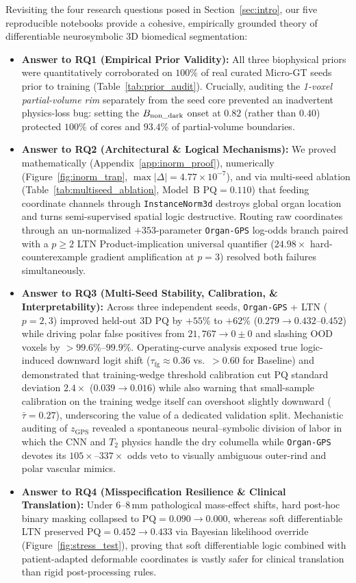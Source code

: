 \documentclass[10pt,a4paper]{article}
\renewcommand{\_}{\origunderscore\allowbreak}
\begin{document}
Revisiting the four research questions posed in Section~\ref{sec:intro}, our five reproducible notebooks provide a cohesive, empirically grounded theory of differentiable neurosymbolic 3D biomedical segmentation:
\begin{itemize}
    \item \textbf{Answer to RQ1 (Empirical Prior Validity):} All three biophysical priors were quantitatively corroborated on $100\%$ of real curated Micro-GT seeds prior to training (Table~\ref{tab:prior_audit}). Crucially, auditing the \emph{1-voxel partial-volume rim} separately from the seed core prevented an inadvertent physics-loss bug: setting the $B_{\text{non\_dark}}$ onset at $0.82$ (rather than $0.40$) protected $100\%$ of cores and $93.4\%$ of partial-volume boundaries.
    \item \textbf{Answer to RQ2 (Architectural \& Logical Mechanisms):} We proved mathematically (Appendix~\ref{app:inorm_proof}), numerically (Figure~\ref{fig:inorm_trap}, $\max|\Delta| = 4.77\times 10^{-7}$), and via multi-seed ablation (Table~\ref{tab:multiseed_ablation}, Model~B $\text{PQ} = 0.110$) that feeding coordinate channels through \texttt{InstanceNorm3d} destroys global organ location and turns semi-supervised spatial logic destructive. Routing raw coordinates through an un-normalized $+353$-parameter \texttt{Organ-GPS} log-odds branch paired with a $p \ge 2$ LTN Product-implication universal quantifier ($24.98\times$ hard-counterexample gradient amplification at $p=3$) resolved both failures simultaneously.
    \item \textbf{Answer to RQ3 (Multi-Seed Stability, Calibration, \& Interpretability):} Across three independent seeds, \texttt{Organ-GPS} + LTN ($p=2, 3$) improved held-out 3D $\text{PQ}$ by $+55\%$ to $+62\%$ ($0.279 \to 0.432\text{--}0.452$) while driving polar false positives from $21{,}767 \to 0 \pm 0$ and slashing OOD voxels by $>99.6\%$--$99.9\%$. Operating-curve analysis exposed true logic-induced downward logit shift ($\tau_{\text{fg}} \approx 0.36$ vs.\ $>0.60$ for Baseline) and demonstrated that training-wedge threshold calibration cut $\text{PQ}$ standard deviation $2.4\times$ ($0.039 \to 0.016$) while also warning that small-sample calibration on the training wedge itself can overshoot slightly downward ($\bar{\tau} = 0.27$), underscoring the value of a dedicated validation split. Mechanistic auditing of $z_{\text{GPS}}$ revealed a spontaneous neural--symbolic division of labor in which the CNN and $T_2$ physics handle the dry columella while \texttt{Organ-GPS} devotes its $105\times$--$337\times$ odds veto to visually ambiguous outer-rind and polar vascular mimics.
    \item \textbf{Answer to RQ4 (Misspecification Resilience \& Clinical Translation):} Under $6\text{--}8\,\text{mm}$ pathological mass-effect shifts, hard post-hoc binary masking collapsed to $\text{PQ} = 0.090 \to 0.000$, whereas soft differentiable LTN preserved $\text{PQ} = 0.452 \to 0.433$ via Bayesian likelihood override (Figure~\ref{fig:stress_test}), proving that soft differentiable logic combined with patient-adapted deformable coordinates is vastly safer for clinical translation than rigid post-processing rules.
\end{itemize}
\end{document}
